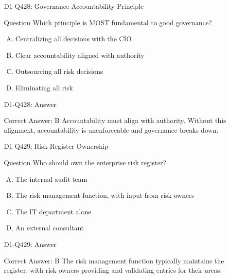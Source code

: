 \documentclass{beamer}
\begin{document}
\begin{frame}{D1-Q428: Governance Accountability Principle}
	\begin{block}{Question}
		Which principle is MOST fundamental to good governance?
	\end{block}
	\begin{enumerate}[(A)]
		\item Centralizing all decisions with the CIO
		\item Clear accountability aligned with authority
		\item Outsourcing all risk decisions
		\item Eliminating all risk
	\end{enumerate}
\end{frame}
\begin{frame}{D1-Q428: Answer}
	\begin{block}{Correct Answer: B}
		Accountability must align with authority. Without this alignment, accountability is unenforceable and governance breaks down.
	\end{block}
\end{frame}

\begin{frame}{D1-Q429: Risk Register Ownership}
	\begin{block}{Question}
		Who should own the enterprise risk register?
	\end{block}
	\begin{enumerate}[(A)]
		\item The internal audit team
		\item The risk management function, with input from risk owners
		\item The IT department alone
		\item An external consultant
	\end{enumerate}
\end{frame}
\begin{frame}{D1-Q429: Answer}
	\begin{block}{Correct Answer: B}
		The risk management function typically maintains the register, with risk owners providing and validating entries for their areas.
	\end{block}
\end{frame}
\end{document}
